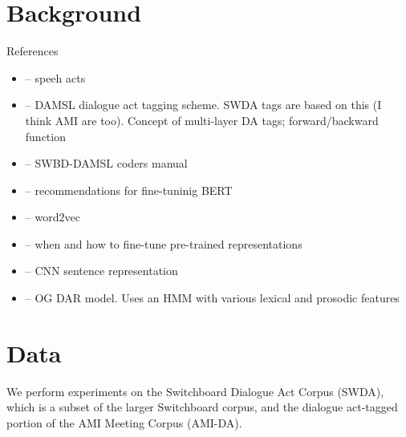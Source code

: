 \documentclass[11pt,a4paper]{article}
\begin{document}
\section{Background} %

References
\begin{itemize}
  \item \citet{austinHowThingsWords2009} -- speeh acts
  \item \citet{coreCodingDialogsDAMSL1997} -- DAMSL dialogue act tagging scheme. SWDA tags are based on this (I think AMI are too). Concept of multi-layer DA tags; forward/backward function
  \item \citet{jurafskySwitchboardSWBDDAMSLShallowDiscourseFunction1997a} -- SWBD-DAMSL coders manual
  \item \citet{sunHowFineTuneBERT2019} -- recommendations for fine-tuninig BERT
  \item \citet{mikolovDistributedRepresentationsWords2013} -- word2vec
  \item \citet{petersTuneNotTune2019} -- when and how to fine-tune pre-trained representations
  \item \citet{kimConvolutionalNeuralNetworks2014} -- CNN sentence representation
  \item \citet{stolckeDialogueActModeling2000} -- OG DAR model. Uses an HMM with various lexical and prosodic features
\end{itemize}

\section{Data}
We perform experiments on the Switchboard Dialogue Act Corpus (SWDA), which is a subset of the larger Switchboard corpus, and the dialogue act-tagged portion of the AMI Meeting Corpus (AMI-DA). 

\end{document}

